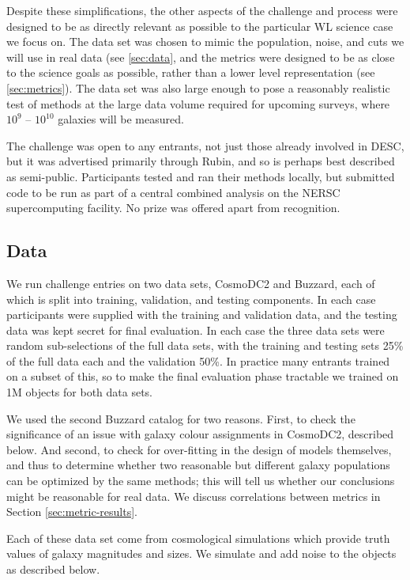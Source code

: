 \documentclass[twocolumn,twocolappendix]{aastex63}
\begin{document}
Despite these simplifications, the other aspects of the challenge and process were designed to be
as directly relevant as possible to the particular WL science case we focus on.  The data set
was chosen to mimic the population, noise, and cuts we will use in real data (see \autoref{sec:data}, 
and the metrics were designed to be as close to the science goals as possible, rather than a lower
level representation (see \autoref{sec:metrics}). The data set was also large enough to pose a 
reasonably realistic test of methods at the large data volume required for upcoming surveys, where
$10^9$ -- $10^{10}$ galaxies will be measured.

The challenge was open to any entrants, not just those already involved in DESC, but it was
advertised primarily through Rubin, and so is perhaps best described as semi-public.
Participants tested and ran their methods locally, but submitted code to be run as part of a central
combined analysis on the NERSC supercomputing facility.  No prize was offered apart from recognition.


\subsection{Data}
\label{sec:data}

We run challenge entries on two data sets, CosmoDC2 and Buzzard, each of which is split into training, 
validation, and testing components.  In each case participants were supplied with the training and 
validation data, and the testing data was kept secret for final evaluation. In each case the three
data sets were random sub-selections of the full data sets, with the training and testing sets 25\% of 
the full data each and the validation 50\%. In practice many entrants trained on a subset of
this, so to make the final evaluation phase tractable we trained on 1M objects for both data sets.

We used the second Buzzard catalog for two reasons.  First, to check the significance of
an issue with galaxy colour assignments in CosmoDC2, described below.  And second, to check
for over-fitting in the design of models themselves, and thus to determine whether two
reasonable but different galaxy populations can be optimized by the same methods; this will
tell us whether our conclusions might be reasonable for real data. We discuss correlations
between metrics in Section \ref{sec:metric-results}.

Each of these data set come from cosmological simulations which provide truth values of galaxy magnitudes
and sizes.  We simulate and add noise to the objects as described below.
\end{document}
